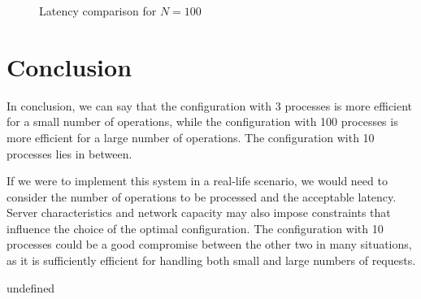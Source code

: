 \begin{figure}[ht!]
    \centering
    \caption{Latency comparison for \( N = 100 \)}
\end{figure}

\section{Conclusion}
In conclusion, we can say that the configuration with 3 processes is more
efficient for a small number of operations, while the configuration with 100
processes is more efficient for a large number of operations. The configuration
with 10 processes lies in between.

If we were to implement this system in a real-life scenario, we would need to
consider the number of operations to be processed and the acceptable latency.
Server characteristics and network capacity may also impose constraints that
influence the choice of the optimal configuration. The configuration with 10
processes could be a good compromise between the other two in many situations,
as it is sufficiently efficient for handling both small and large numbers of requests.


undefined